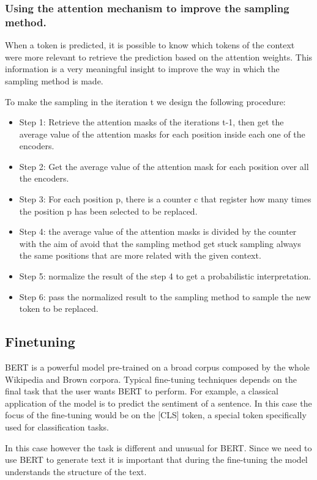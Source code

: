 \documentclass[10pt,twocolumn,letterpaper]{article}
\begin{document}
\subsubsection{Using the attention mechanism to improve the sampling method.}
When a token is predicted, it is possible to know which tokens of the context were more relevant to
retrieve the prediction based on the attention weights. This information is a very meaningful insight to improve
the way in which the sampling method is made.

To make the sampling in the iteration t we design the following procedure:

\begin{itemize}
\item Step 1: Retrieve the attention masks of the iterations t-1, then get the average value of the attention masks for each position inside each one of the encoders.
\item Step 2: Get the average value of the attention mask for each position over all the encoders.
\item Step 3: For each position p, there is a counter c that register how many times the position p has been selected to be replaced.
\item Step 4: the average value of the attention masks is divided by the counter with the aim of avoid that the sampling method get stuck sampling always the same positions that are more related with the given context.
\item Step 5: normalize the result of the step 4 to get a probabilistic interpretation.
\item Step 6: pass the normalized result to the sampling method to sample the new token to be replaced.
\end{itemize}

\subsection{Finetuning}
BERT is a powerful model pre-trained on a broad corpus composed by the whole
Wikipedia and Brown corpora.
Typical fine-tuning techniques depends on the final task that the user wants BERT to perform.
For example, a classical application of the model is to predict the sentiment of a sentence.
In this case the focus of the fine-tuning would be on the [CLS] token,
a special token specifically used for classification tasks.

In this case however the task is different and unusual for BERT.
Since we need to use BERT to generate text it is important that during the
fine-tuning the model understands the structure of the text.
\end{document}
